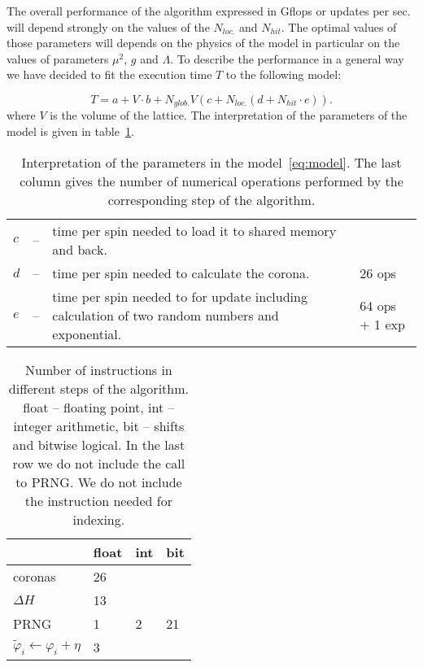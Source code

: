 \documentclass[a4paper]{llncs}
\newcommand{\vphi}{\varphi}
\begin{document}
The overall performance of the algorithm expressed in Gflops or updates per
sec. will depend strongly on the values of the $N_{loc.}$ and $N_{hit}$. The
optimal values of those parameters will depends on the physics of the model in
particular on the values of parameters $\mu^2$, $g$ and $\Lambda$. To describe
the performance in a general way we have decided to fit the execution time $T$
to the following model:

\begin{equation}\label{eq:model}
T  = a+ V \cdot b +
N_{glob.} V \left(c + N_{loc.}\left(d + N_{hit}\cdot e\right)\right) .
\end{equation}
where $V$ is the volume of the lattice.  The interpretation of the
parameters of the model is given in table~\ref{tab:pars-int}.

\begin{table}
\begin{center} \begin{tabular}{lcp{8cm}p{2cm}}
$c$ &--& time per spin needed to load it to shared memory and back.&\\
$d$ &--& time per spin needed to calculate the corona.& 26 ops\\
$e$ &--& time per spin needed to for update including calculation of two
random numbers and exponential. & 64 ops + 1 exp
\end{tabular}
\end{center}
\caption{\label{tab:pars-int}Interpretation of the parameters in the
model~\ref{eq:model}. The last column gives the number of numerical operations
performed by the corresponding step of the algorithm.}
\end{table}

\begin{table}

\begin{center}
\begin{tabular}{|p{4cm}|l|l|l|}\hline\hline
 & float & int  & bit \\\hline
coronas & 26 & & \\\hline
$\Delta H  $ & 13  & & \\\hline
PRNG & 1 & 2  & 21  \\\hline
$\widetilde{\vphi}_i \gets \vphi_i+\eta$& 3 & &\\\hline\hline
\end{tabular}
\end{center}

\caption{\label{tab:instr-count}Number of instructions in different steps of
the algorithm. float -- floating point, int -- integer arithmetic, bit --
shifts and bitwise logical. In the last row we do not include the call to PRNG.
We do not include the instruction needed for indexing.}

\end{table}
\end{document}
